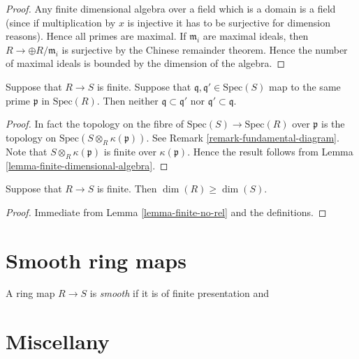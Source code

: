 \begin{proof}
Any finite dimensional algebra over a field which is a
domain is a field (since if multiplication by $x$ is injective
it has to be surjective for dimension reasons). Hence all primes
are maximal. If $\mathfrak m_i$ are maximal ideals, then
$R \to \oplus R/\mathfrak m_i$ is surjective by the Chinese
remainder theorem. Hence the number of maximal ideals
is bounded by the dimension of the algebra.
\end{proof}

\begin{lemma}
\label{lemma-finite-no-rel}
Suppose that $R \to S$ is finite. Suppose that
$\mathfrak q, \mathfrak q' \in \text{Spec}(S)$
map to the same prime $\mathfrak p$ in 
$\text{Spec}(R)$. Then neither $\mathfrak q \subset \mathfrak q'$
nor $\mathfrak q' \subset \mathfrak q$.
\end{lemma}

\begin{proof}
In fact the topology on the fibre of
$\text{Spec}(S) \to  \text{Spec}(R)$ over
$\mathfrak p$ is the topology on
$\text{Spec}(S \otimes_R \kappa(\mathfrak p))$.
See Remark \ref{remark-fundamental-diagram}.
Note that $S \otimes_R \kappa(\mathfrak p)$ is finite
over $\kappa(\mathfrak p)$. Hence the result follows
from Lemma \ref{lemma-finite-dimensional-algebra}.
\end{proof}

\begin{lemma}
\label{lemma-finite-dim-up}
Suppose that $R \to S$ is finite.
Then $\dim (R) \geq \dim(S)$.
\end{lemma}

\begin{proof}
Immediate from Lemma \ref{lemma-finite-no-rel} and the definitions.
\end{proof}








\section{Smooth ring maps}
\label{section-smooth}

\begin{definition}
\label{definition-smooth}
A ring map $R \to S$ is {\it smooth} if it is of finite presentation
and 
\end{definition}

\section{Miscellany}
\label{section-miscellany}

